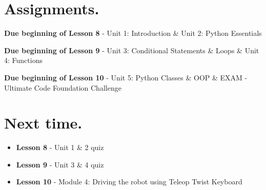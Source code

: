 \documentclass{handout}
\begin{document}
\section{Assignments.}
	\begin{todolist}
		\item \textbf{Due beginning of Lesson 8} - Unit 1: Introduction \& Unit 2: Python Essentials
		\item \textbf{Due beginning of Lesson 9} - Unit 3: Conditional Statements \& Loops \& Unit 4: Functions 
		\item \textbf{Due beginning of Lesson 10} - Unit 5: Python Classes \& OOP \& EXAM - Ultimate Code Foundation Challenge
	\end{todolist}

\section{Next time.}
	\begin{itemize}
		\item \textbf{Lesson 8} - Unit 1 \& 2 quiz
		\item \textbf{Lesson 9} - Unit 3 \& 4 quiz
		\item \textbf{Lesson 10} - Module 4: Driving the robot using Teleop Twist Keyboard
	\end{itemize}
\end{document}
